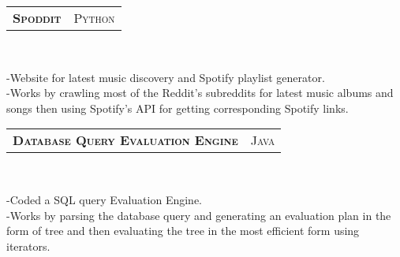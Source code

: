 \documentclass[10pt,letterpaper,oneside]{article}
\begin{document}
    \begin{tabular}{c|c}
        \textbf{\normalsize S\textsc{poddit}}
        &\textmd{\normalsize P\textsc{ython}}
    \end{tabular}\\
     \vspace{-4mm}
    \begin{adjustwidth}{7pt}{0pt}
        {\footnotesize -Website for latest music
        discovery and Spotify playlist generator.\\
        -Works by crawling most of the Reddit's subreddits for
        latest music albums and songs then using Spotify's API for
        getting corresponding Spotify links.}\\
    \end{adjustwidth}
    \vspace{-6pt}
    \begin{tabular}{c|c}
        \textbf{\normalsize D\textsc{atabase} Q\textsc{uery}
        E\textsc{valuation} E\textsc{ngine}}
        &\textmd{\normalsize J\textsc{ava}}
    \end{tabular}\\
     \vspace{-4mm}
    \begin{adjustwidth}{7pt}{0pt}
        {\footnotesize -Coded a SQL query Evaluation Engine.\\
        -Works by parsing the database query and generating an evaluation plan in the form of tree and then evaluating the tree in the most efficient form using iterators.}\\
    \end{adjustwidth}
    \begin{comment}
        \vspace{-6pt}
        \begin{tabular}{c|c}
            \textbf{\normalsize S\textsc{impella}}
            &\textmd{\normalsize J\textsc{ava}}
        \end{tabular}\\
         \vspace{-4mm}
        \begin{adjustwidth}{7pt}{0pt}
            {\footnotesize -Implemented a simplified version of the
            Gnutella Protocol Version 0.6, A chatting and file transfer
            system.\\
            -Analyzed important networking concepts like routing tables, table lookup, controlled
            flooding, protocol, packet formatting and distributive
            collaboration.\\
            -Included multitasking capabilities like simultaneous
            downloads and monitoring}\\
        \end{adjustwidth}
    \end{comment}
\end{document}

